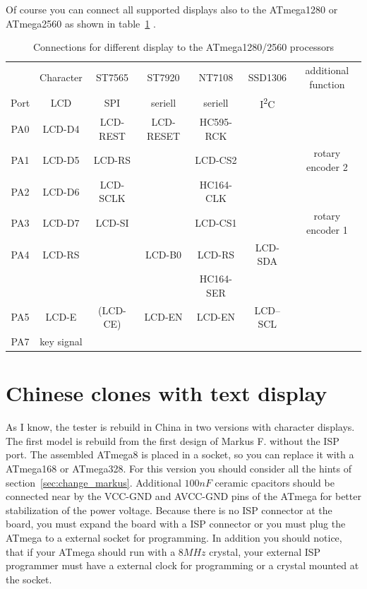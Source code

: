 Of course you can connect all supported displays also to the ATmega1280 or ATmega2560
as shown in table~\ref{tab:display-1280} .

\begin{table}[H]
  \begin{center}
    \begin{tabular}{| c || c | c | c | c | c | c |}
    \hline
           & Character     &  ST7565     & ST7920       & NT7108       & SSD1306     & additional function \\
      Port & LCD           &    SPI      & seriell      & seriell      &    I\textsuperscript{2}C      & \\
    \hline
    \hline
    PA0    &  LCD-D4       &   LCD-REST  &  LCD-RESET   & HC595-RCK      &             & \\
    \hline
    PA1    &  LCD-D5       &   LCD-RS    &              & LCD-CS2        &             & rotary encoder 2 \\
    \hline
    PA2    &  LCD-D6       &   LCD-SCLK  &              & HC164-CLK      &             & \\
    \hline
    PA3    &  LCD-D7       &   LCD-SI    &              & LCD-CS1        &             & rotary encoder 1 \\
    \hline
    PA4    &  LCD-RS       &             &   LCD-B0     & LCD-RS         &   LCD-SDA   & \\
           &               &             &              & HC164-SER      &             & \\
    \hline
    PA5    &  LCD-E        &   (LCD-CE)  &   LCD-EN     & LCD-EN         &   LCD--SCL  & \\
    \hline
    PA7    &  key signal   &             &              &                &             & \\
    \hline
    \end{tabular}
  \end{center}
  \caption{Connections for different display to the ATmega1280/2560 processors}
  \label{tab:display-1280}
\end{table}


\section{Chinese clones with text display}
As I know, the tester is rebuild in China in two versions with character displays.
The first model is rebuild from the first design of Markus F. without the ISP port.
The assembled ATmega8 is placed in a socket, so you can replace it with a ATmega168 or ATmega328.
For this version you should consider all the hints of section~\ref{sec:change_markus}.
Additional \(100nF\) ceramic cpacitors should be connected near by the VCC-GND and AVCC-GND pins of
the ATmega for better stabilization of the power voltage.
Because there is no ISP connector at the board, you must expand the board with a ISP connector or you
must plug the ATmega to a external socket for programming.
In addition you should notice, that if your ATmega should run with a \(8MHz\) crystal,
your external ISP programmer must have a external clock for programming or a crystal mounted at the socket.\\

